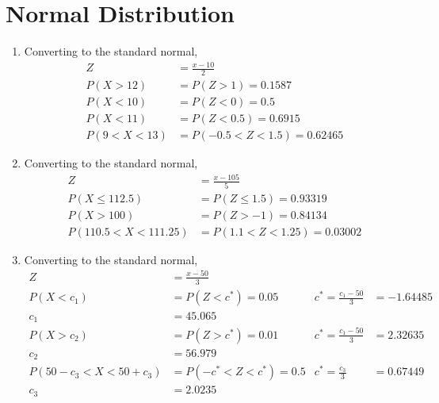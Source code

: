\section{Normal Distribution}

\begin{enumerate}
    \item Converting to the standard normal,
          \begin{align}
              Z             & = \frac{x-10}{2}              \\
              P(X > 12)     & = P(Z > 1) = 0.1587           \\
              P(X < 10)     & = P(Z < 0) = 0.5              \\
              P(X < 11)     & = P(Z < 0.5) = 0.6915         \\
              P(9 < X < 13) & = P(-0.5 < Z < 1.5) = 0.62465
          \end{align}

    \item Converting to the standard normal,
          \begin{align}
              Z                     & = \frac{x-105}{5}             \\
              P(X \leq 112.5)       & = P(Z \leq 1.5) = 0.93319     \\
              P(X > 100)            & = P(Z > -1) = 0.84134         \\
              P(110.5 < X < 111.25) & = P(1.1 < Z < 1.25) = 0.03002
          \end{align}

    \item Converting to the standard normal,
          \begin{align}
              Z                        & = \frac{x-50}{3}            \\
              P(X < c_1)               & = P(Z < c^*) = 0.05       &
              c^* = \frac{c_1-50}{3}   & = -1.64485                  \\
              c_1                      & = 45.065                    \\
              P(X > c_2)               & = P(Z > c^*) = 0.01       &
              c^* = \frac{c_1-50}{3}   & = 2.32635                   \\
              c_2                      & = 56.979                    \\
              P(50-c_3 < X < 50 + c_3) & = P(-c^* < Z < c^*) = 0.5 &
              c^* = \frac{c_3}{3}      & = 0.67449                   \\
              c_3                      & = 2.0235
          \end{align}


\end{enumerate}
